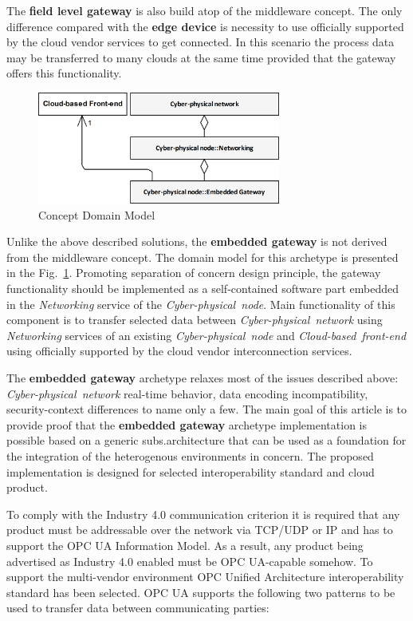 \documentclass{jacsart}
\begin{document}
The \textbf{field level gateway} is also build atop of the middleware concept. The only difference compared with the \textbf{edge device} is necessity to use officially supported by the cloud vendor services to get connected. In this scenario the process data may be transferred to many clouds at the same time provided that the gateway offers this functionality.

\begin{figure}
      \centering
      \includegraphics[width=8cm]{../.Media/StrategyDomainModel.png}
      \caption{Concept Domain Model}\label{figure1.StrategyDomainModel}
\end{figure}

Unlike the above described solutions, the \textbf{embedded gateway} is not derived from the middleware concept. The domain model for this archetype is presented in the Fig.~\ref*{figure1.StrategyDomainModel}. Promoting separation of concern design principle, the gateway functionality should be implemented as a self-contained software part embedded in the \textit{Networking} service of the \textit{Cyber-physical\ node}. Main functionality of this component is to transfer selected data between \textit{Cyber-physical\ network} using \textit{Networking} services of an existing \textit{Cyber-physical\ node} and \textit{Cloud-based\ front-end} using officially supported by the cloud vendor interconnection services.

The \textbf{embedded gateway} archetype relaxes most of the issues described above: \textit{Cyber-physical\ network} real-time behavior, data encoding incompatibility, security-context differences to name only a few. The main goal of this article is to provide proof that the \textbf{embedded gateway} archetype implementation is possible based on a generic subs.architecture that can be used as a foundation for the integration of the heterogenous environments in concern. The proposed implementation is designed for selected interoperability standard and cloud product.

To comply with the Industry 4.0 communication criterion it is required that any product must be addressable over the network via TCP/UDP or IP and has to support the OPC UA Information Model. As a result, any product being advertised as Industry 4.0 enabled must be OPC UA-capable somehow. To support the multi-vendor environment OPC Unified Architecture interoperability standard has been selected. OPC UA supports the following two patterns to be used to transfer data between communicating parties:
\end{document}
